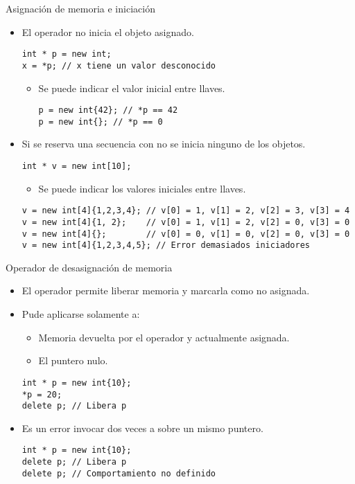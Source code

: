 \begin{frame}[t,fragile]{Asignación de memoria e iniciación}
\begin{itemize}
  \item El operador  no inicia el objeto asignado.
\begin{lstlisting}
int * p = new int;
x = *p; // x tiene un valor desconocido
\end{lstlisting}
    \begin{itemize}
      \item Se puede indicar el valor inicial entre llaves.
\begin{lstlisting}
p = new int{42}; // *p == 42
p = new int{}; // *p == 0
\end{lstlisting}
    \end{itemize}

  \vfill\pause
  \item Si se reserva una secuencia con  no se inicia ninguno de los objetos.
\begin{lstlisting}
int * v = new int[10];
\end{lstlisting}
    \begin{itemize}
      \item Se puede indicar los valores iniciales entre llaves.
    \end{itemize}
\begin{lstlisting}
v = new int[4]{1,2,3,4}; // v[0] = 1, v[1] = 2, v[2] = 3, v[3] = 4
v = new int[4]{1, 2};    // v[0] = 1, v[1] = 2, v[2] = 0, v[3] = 0
v = new int[4]{};        // v[0] = 0, v[1] = 0, v[2] = 0, v[3] = 0
v = new int[4]{1,2,3,4,5}; // Error demasiados iniciadores
\end{lstlisting}
\end{itemize}
\end{frame}

\begin{frame}[fragile]{Operador de desasignación de memoria}
\begin{itemize}
  \item El operador  permite liberar memoria y marcarla como no asignada.
  \item Pude aplicarse solamente a:
    \begin{itemize}
      \item Memoria devuelta por el operador  y actualmente asignada.
      \item El puntero nulo.
    \end{itemize}
\begin{lstlisting}
int * p = new int{10};
*p = 20;
delete p; // Libera p
\end{lstlisting}
  \item Es un error invocar dos veces a  sobre un mismo puntero.
\begin{lstlisting}
int * p = new int{10};
delete p; // Libera p
delete p; // Comportamiento no definido
\end{lstlisting}
\end{itemize}
\end{frame}

